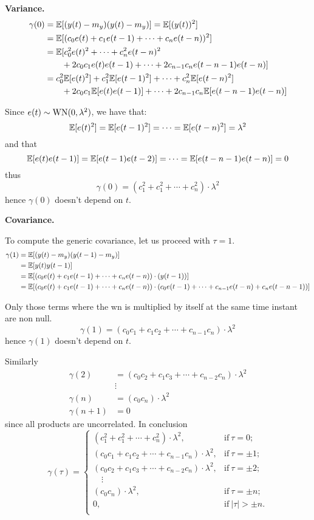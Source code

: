\textbf{Variance.}
\begin{align*}
	\gamma (0)&=\mathbb{E}[(y(t)-m_{y})(y(t)-m_{y})]=\mathbb{E}[(y(t))^2]\\
	&=\mathbb{E}[(c_{0} e(t)+c_{1} e(t-1)+\cdots+c_{n} e(t-n))^{2}]\\
	&=\mathbb{E}[c_{0}^{2} e(t)^{2}+\cdots+c_{n}^{2} e(t-n)^{2}\\
	&\qquad+2 c_{0} c_{1} e(t) e(t-1)+\cdots+2 c_{n-1} c_{n} e(t-n-1) e(t-n)]\\
	&=c_{0}^{2} \mathbb{E}[e(t)^{2}]+c_{1}^{2} \mathbb{E}[e(t-1)^{2}]+\cdots+c_{n}^{2} \mathbb{E}[e(t-n)^{2}]\\
	&\qquad+2 c_{0} c_{1} \mathbb{E}[e(t) e(t-1)]+\cdots+2 c_{n-1} c_{n} \mathbb{E}[e(t-n-1) e(t-n)]
\end{align*}

Since $e(t) \sim \operatorname{WN}(0, \lambda^{2})$, we have that:
$$
\mathbb{E}[e(t)^{2}]=\mathbb{E}[e(t-1)^{2}]=\cdots=\mathbb{E}[e(t-n)^{2}]=\lambda^{2}
$$
and that
$$
\mathbb{E}[e(t) e(t-1)] = \mathbb{E}[e(t-1) e(t-2)] = \cdots = \mathbb{E}[e(t-n-1) e(t-n)]=0
$$
thus
\[
	\boxed{\gamma (0)=(c_{1}^2 +c_{1}^2 +\cdots+c_{n}^2 )\cdot\lambda^2}
\]
hence $\gamma (0)$ doesn't depend on $t$.

\textbf{Covariance.}

To compute the generic covariance, let us proceed with $\tau =1$.
\begin{align*}
	\gamma(1)&=\mathbb{E}[(y(t)-m_{y})(y(t-1)-m_{y})]\\
	&=\mathbb{E}[y(t) y(t-1)]\\
	&=\mathbb{E}[(c_{0} e(t)+c_{1} e(t-1)+\cdots+c_{n} e(t-n))\cdot (y(t-1))]\\
	&=\mathbb{E}[(c_{0} e(t)+c_{1} e(t-1)+\cdots+c_{n} e(t-n))\cdot (c_{0} e(t-1)+\cdots+c_{n-1} e(t-n)+c_{n} e(t-n-1))]
\end{align*}

Only those terms where the \gls{wn} is multiplied by itself at the same time instant are non null.
\[
	\gamma (1)=(c_{0}c_{1}+c_{1}c_{2}+\cdots+c_{n-1}c_{n})\cdot\lambda^2
\]
hence $\gamma (1)$ doesn't depend on $t$.

Similarly
\begin{align*}
	\gamma (2) &= (c_{0}c_{2}+c_{1}c_{3}+\cdots+c_{n-2}c_{n})\cdot\lambda^2\\
	&\vdots\\
	\gamma (n) &= (c_{0}c_{n})\cdot\lambda^2\\
	\gamma (n+1) &= 0
\end{align*}
since all products are uncorrelated. In conclusion
\[
	\boxed{
		\gamma (\tau )=\begin{cases}
			(c_{1}^2 +c_{1}^2 +\cdots+c_{n}^2 )\cdot\lambda^2, & \text{if}\ \tau =0;\\
			(c_{0}c_{1}+c_{1}c_{2}+\cdots+c_{n-1}c_{n})\cdot\lambda^2, & \text{if}\ \tau =\pm 1;\\
			(c_{0}c_{2}+c_{1}c_{3}+\cdots+c_{n-2}c_{n})\cdot\lambda^2, & \text{if}\ \tau =\pm 2;\\
			\quad\vdots\\
			(c_{0}c_{n})\cdot\lambda^2, & \text{if}\ \tau =\pm n;\\
			0, & \text{if}\ |\tau| > \pm n.\\
		\end{cases}
	}
\]
